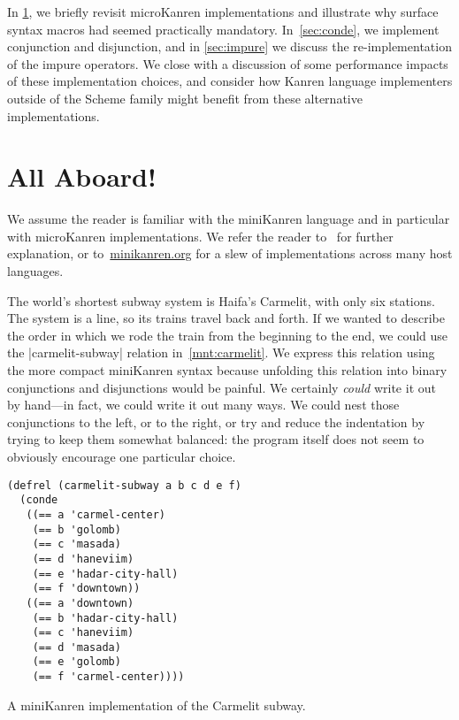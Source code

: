 \documentclass[sigplan,screen,draft,anonymous,review,natbib=false]{acmart}
\begin{document}
In \cref{sec:all-aboard}, we briefly revisit microKanren
implementations and illustrate why surface syntax
macros had seemed practically mandatory. In~\cref{sec:conde}, we implement conjunction and disjunction, and in
\cref{sec:impure} we discuss the re-implementation of the impure
operators. We close with a discussion of some performance impacts of
these implementation choices, and consider how Kanren language
implementers outside of the Scheme family might benefit from these
alternative implementations.

\section{All Aboard!}\label{sec:all-aboard}

We assume the reader is familiar with the miniKanren language and in
particular with microKanren implementations. We refer the reader
to~\cite{friedman2018reasoned,hemann2013muKanren,hemann2016small} for
further explanation, or to~\href{minikanren.org}{minikanren.org} for a
slew of implementations across many host languages.

The world's shortest subway system is Haifa's Carmelit, with only
six stations. The system is a line, so its trains travel back and
forth. If we wanted to describe the order in which we rode the train
from the beginning to the end, we could use the
\rackinline|carmelit-subway| relation in~\cref{mnt:carmelit}. We
express this relation using the more compact miniKanren syntax because
unfolding this relation into binary conjunctions and disjunctions
would be painful. We certainly \emph{could} write it out by hand---in
fact, we could write it out many ways. We could nest those
conjunctions to the left, or to the right, or try and reduce the
indentation by trying to keep them somewhat balanced: the program
itself does not seem to obviously encourage one particular choice.

\begin{listing}
  \begin{verbatim}
(defrel (carmelit-subway a b c d e f)
  (conde
   ((== a 'carmel-center)
    (== b 'golomb)
    (== c 'masada)
    (== d 'haneviim)
    (== e 'hadar-city-hall)
    (== f 'downtown))
   ((== a 'downtown)
    (== b 'hadar-city-hall)
    (== c 'haneviim)
    (== d 'masada)
    (== e 'golomb)
    (== f 'carmel-center))))
  \end{verbatim}
  \caption{A miniKanren implementation of the Carmelit subway.}
  \label{mnt:carmelit}
\end{listing}
\end{document}
